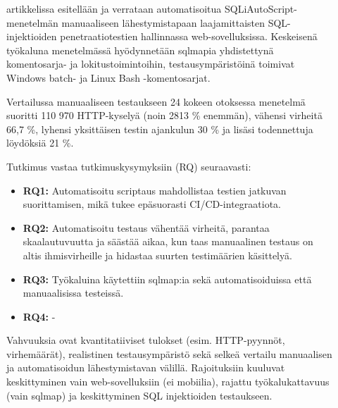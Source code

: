 \documentclass[bscthesis,finnish,oneside,biblatex]{uefcsthesis}
\begin{document}
\begin{description}
    \item[\cite{raman2019_sqli}] artikkelissa esitellään ja verrataan automatisoitua SQLiAutoScript-menetelmän manuaaliseen lähestymistapaan laajamittaisten SQL-injektioiden penetraatiotestien hallinnassa web-sovelluksissa. Keskeisenä työkaluna menetelmässä hyödynnetään sqlmapia yhdistettynä komentosarja- ja lokitustoimintoihin, testausympäristöinä toimivat Windows batch- ja Linux Bash -komentosarjat.

   Vertailussa manuaaliseen testaukseen 24 kokeen otoksessa menetelmä suoritti 110 970 HTTP-kyselyä (noin 2813 \% enemmän), vähensi virheitä 66,7 \%, lyhensi yksittäisen testin ajankulun 30 \% ja lisäsi todennettuja löydöksiä 21 \%.

    Tutkimus vastaa tutkimuskysymyksiin (RQ) seuraavasti:
    \begin{itemize}
        \item \textbf{RQ1:} Automatisoitu scriptaus mahdollistaa testien jatkuvan suorittamisen, mikä tukee epäsuorasti CI/CD-integraatiota.
        \item \textbf{RQ2:} Automatisoitu testaus vähentää virheitä, parantaa skaalautuvuutta ja säästää aikaa, kun taas manuaalinen testaus on altis ihmisvirheille ja hidastaa suurten testimäärien käsittelyä.
        \item \textbf{RQ3:} Työkaluina käytettiin sqlmap:ia sekä automatisoiduissa että manuaalisissa testeissä.
        \item \textbf{RQ4:} -
    \end{itemize}

    Vahvuuksia ovat kvantitatiiviset tulokset (esim. HTTP-pyynnöt, virhemäärät), realistinen testausympäristö sekä selkeä vertailu manuaalisen ja automatisoidun lähestymistavan välillä. Rajoituksiin kuuluvat keskittyminen vain web-sovelluksiin (ei mobiilia), rajattu työkalukattavuus (vain sqlmap) ja keskittyminen SQL injektioiden testaukseen.
\end{description}
\end{document}
